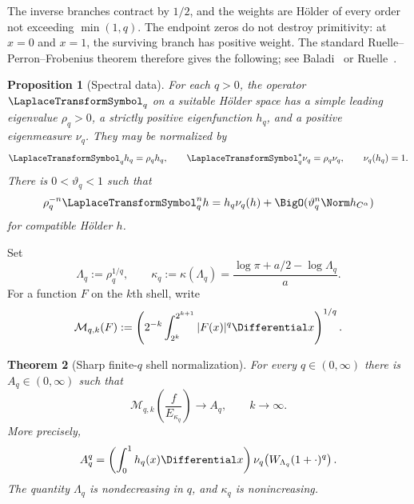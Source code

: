 \documentclass[11pt,oneside]{article}
\newtheorem{theorem}{Theorem}[section]
\newtheorem{proposition}[theorem]{Proposition}
\theoremstyle{definition}
\theoremstyle{remark}
\begin{document}
The inverse branches contract by $1/2$, and the weights are H\"older of every
order not exceeding $\min(1,q)$.  The endpoint zeros do not destroy
primitivity: at $x=0$ and $x=1$, the surviving branch has positive weight.
The standard Ruelle--Perron--Frobenius theorem therefore gives the following;
see Baladi~\cite{baladi} or Ruelle~\cite{ruelle}.

\begin{proposition}[Spectral data]
\label{prop:RPF}
For each $q>0$, the operator $\LaplaceTransformSymbol_q$ on a suitable H\"older space has a
simple leading eigenvalue $\rho_q>0$, a strictly positive eigenfunction $h_q$,
and a positive eigenmeasure $\nu_q$.  They may be normalized by
\begin{equation}
 \LaplaceTransformSymbol_qh_q=\rho_qh_q,
 \qquad
 \LaplaceTransformSymbol_q^*\nu_q=\rho_q\nu_q,
 \qquad
 \nu_q(h_q)=1.
 \label{eq:RPF-normalization}
\end{equation}
There is $0<\vartheta_q<1$ such that
\begin{equation}
 \rho_q^{-n}\LaplaceTransformSymbol_q^nh
 =h_q\nu_q(h)+\BigO(\vartheta_q^n\Norm h_{C^\alpha})
 \label{eq:RPF-gap}
\end{equation}
for compatible H\"older $h$.
\end{proposition}

Set
\begin{equation}
 \Lambda_q:=\rho_q^{1/q},
 \qquad
 \kappa_q:=\kappa(\Lambda_q)
 =\frac{\log\pi+a/2-\log\Lambda_q}{a}.
 \label{eq:kappa-q}
\end{equation}
For a function $F$ on the $k$th shell, write
\begin{equation}
 \mathcal M_{q,k}(F):=
 \left(2^{-k}\int_{2^k}^{2^{k+1}}|F(x)|^q\Differential x\right)^{1/q}.
 \label{eq:shell-Lq}
\end{equation}

\begin{theorem}[Sharp finite-$q$ shell normalization]
\label{thm:Lq-spectrum}
For every $q\in(0,\infty)$ there is $A_q\in(0,\infty)$ such that
\begin{equation}
 \mathcal M_{q,k}\!\left(\frac{f}{E_{\kappa_q}}\right)
 \longrightarrow A_q,
 \qquad k\to\infty.
 \label{eq:Lq-limit}
\end{equation}
More precisely,
\begin{equation}
 A_q^q=
 \left(\int_0^1h_q(x)\Differential x\right)
 \nu_q\!\left(W_{\Lambda_q}(1+\cdot)^q\right).
 \label{eq:Aq}
\end{equation}
The quantity $\Lambda_q$ is nondecreasing in $q$, and $\kappa_q$ is
nonincreasing.
\end{theorem}
\end{document}
